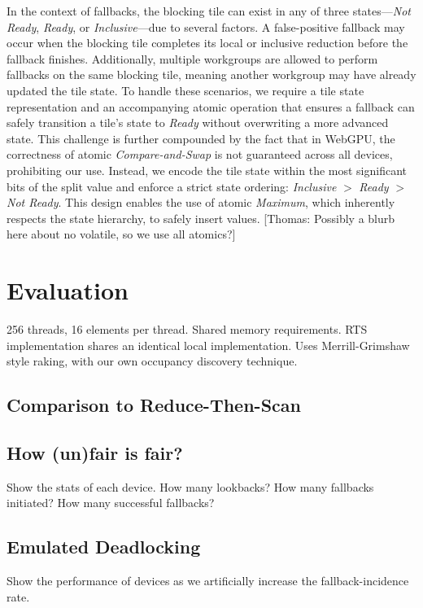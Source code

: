 \documentclass[sigconf]{acmart}
\newcommand{\thomas}[1]{{\footnotesize\color{orange}[Thomas: #1]}}
\begin{document}
In the context of fallbacks, the blocking tile can exist in any of three states—\emph{Not Ready}, \emph{Ready}, or \emph{Inclusive}—due to several factors. A false-positive fallback may occur when the blocking tile completes its local or inclusive reduction before the fallback finishes. Additionally, multiple workgroups are allowed to perform fallbacks on the same blocking tile, meaning another workgroup may have already updated the tile state. To handle these scenarios, we require a tile state representation and an accompanying atomic operation that ensures a fallback can safely transition a tile's state to \emph{Ready} without overwriting a more advanced state. This challenge is further compounded by the fact that in WebGPU, the correctness of atomic \emph{Compare-and-Swap} is not guaranteed across all devices, prohibiting our use. Instead, we encode the tile state within the most significant bits of the split value and enforce a strict state ordering: \emph{Inclusive} $>$ \emph{Ready} $>$ \emph{Not Ready}. This design enables the use of atomic \emph{Maximum}, which inherently respects the state hierarchy, to safely insert values.
\thomas{Possibly a blurb here about no volatile, so we use all atomics?}

\section{Evaluation}
256 threads, 16 elements per thread. Shared memory requirements. RTS implementation shares an identical local implementation. Uses Merrill-Grimshaw style raking, with our own occupancy discovery technique.

\subsection{Comparison to Reduce-Then-Scan}

\subsection{How (un)fair is fair?}
Show the stats of each device. How many lookbacks?  How many fallbacks initiated? How many successful fallbacks?

\subsection{Emulated Deadlocking}
Show the performance of devices as we artificially increase the fallback-incidence rate.
\end{document}
